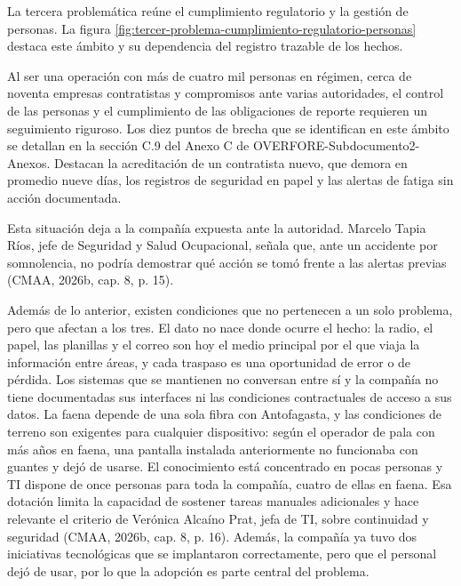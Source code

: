 \documentclass[subdoc]{../../comun/overfore}
\begin{document}
La tercera problemática reúne el cumplimiento regulatorio y la gestión de personas. La figura \ref{fig:tercer-problema-cumplimiento-regulatorio-personas} destaca este ámbito y su dependencia del registro trazable de los hechos.

Al ser una operación con más de cuatro mil personas en régimen, cerca de noventa empresas contratistas y compromisos ante varias autoridades, el control de las personas y el cumplimiento de las obligaciones de reporte requieren un seguimiento riguroso. Los diez puntos de brecha que se identifican en este ámbito se detallan en la sección C.9 del Anexo C de OVERFORE-Subdocumento2-Anexos. Destacan la acreditación de un contratista nuevo, que demora en promedio nueve días, los registros de seguridad en papel y las alertas de fatiga sin acción documentada.

Esta situación deja a la compañía expuesta ante la autoridad. Marcelo Tapia Ríos, jefe de Seguridad y Salud Ocupacional, señala que, ante un accidente por somnolencia, no podría demostrar qué acción se tomó frente a las alertas previas (CMAA, 2026b, cap. 8, p. 15).

Además de lo anterior, existen condiciones que no pertenecen a un solo problema, pero que afectan a los tres. El dato no nace donde ocurre el hecho: la radio, el papel, las planillas y el correo son hoy el medio principal por el que viaja la información entre áreas, y cada traspaso es una oportunidad de error o de pérdida. Los sistemas que se mantienen no conversan entre sí y la compañía no tiene documentadas sus interfaces ni las condiciones contractuales de acceso a sus datos. La faena depende de una sola fibra con Antofagasta, y las condiciones de terreno son exigentes para cualquier dispositivo: según el operador de pala con más años en faena, una pantalla instalada anteriormente no funcionaba con guantes y dejó de usarse. El conocimiento está concentrado en pocas personas y TI dispone de once personas para toda la compañía, cuatro de ellas en faena. Esa dotación limita la capacidad de sostener tareas manuales adicionales y hace relevante el criterio de Verónica Alcaíno Prat, jefa de TI, sobre continuidad y seguridad (CMAA, 2026b, cap. 8, p. 16). Además, la compañía ya tuvo dos iniciativas tecnológicas que se implantaron correctamente, pero que el personal dejó de usar, por lo que la adopción es parte central del problema.
\end{document}
